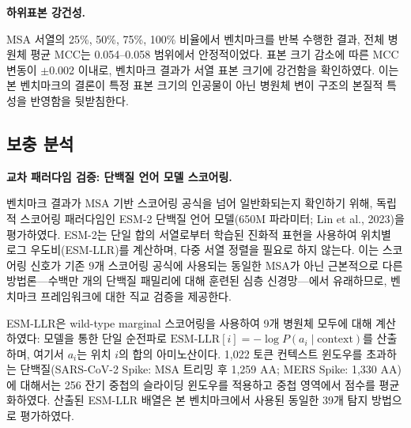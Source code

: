 \textbf{하위표본 강건성.}
\label{subsec:9pathogen_subsampling}

MSA 서열의 25\%, 50\%, 75\%, 100\% 비율에서 벤치마크를 반복 수행한 결과, 전체 병원체 평균 MCC는 0.054--0.058 범위에서 안정적이었다.
표본 크기 감소에 따른 MCC 변동이 $\pm$0.002 이내로, 벤치마크 결과가 서열 표본 크기에 강건함을 확인하였다.
이는 본 벤치마크의 결론이 특정 표본 크기의 인공물이 아닌 병원체 변이 구조의 본질적 특성을 반영함을 뒷받침한다.


\subsection{보충 분석}
\label{subsec:9pathogen_supplementary}

\textbf{교차 패러다임 검증: 단백질 언어 모델 스코어링.}
\label{subsec:esm_validation}

벤치마크 결과가 MSA 기반 스코어링 공식을 넘어 일반화되는지 확인하기 위해, 독립적 스코어링 패러다임인 ESM-2 단백질 언어 모델(650M 파라미터; Lin et al., 2023)을 평가하였다. ESM-2는 단일 합의 서열로부터 학습된 진화적 표현을 사용하여 위치별 로그 우도비(ESM-LLR)를 계산하며, 다중 서열 정렬을 필요로 하지 않는다. 이는 스코어링 신호가 기존 9개 스코어링 공식에 사용되는 동일한 MSA가 아닌 근본적으로 다른 방법론---수백만 개의 단백질 패밀리에 대해 훈련된 심층 신경망---에서 유래하므로, 벤치마크 프레임워크에 대한 직교 검증을 제공한다.

ESM-LLR은 wild-type marginal 스코어링을 사용하여 9개 병원체 모두에 대해 계산하였다: 모델을 통한 단일 순전파로 $\text{ESM-LLR}[i] = -\log P(a_i \mid \text{context})$를 산출하며, 여기서 $a_i$는 위치 $i$의 합의 아미노산이다. 1,022 토큰 컨텍스트 윈도우를 초과하는 단백질(SARS-CoV-2 Spike: MSA 트리밍 후 1,259 AA; MERS Spike: 1,330 AA)에 대해서는 256 잔기 중첩의 슬라이딩 윈도우를 적용하고 중첩 영역에서 점수를 평균화하였다. 산출된 ESM-LLR 배열은 본 벤치마크에서 사용된 동일한 39개 탐지 방법으로 평가하였다.

